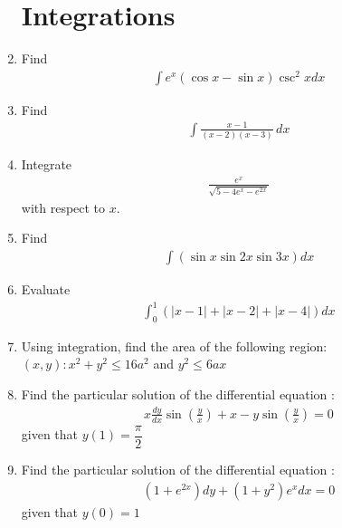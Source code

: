 \documentclass[12pt,-letter paper]{article}
\providecommand{\brak}[1]{\ensuremath{\left(#1\right)}}
\begin{document}
\begin{enumerate}

\section*{Integrations}

\item Find \begin{align*}\int e^x\brak{\cos x-\sin x}\csc^2 x dx\end{align*}

\item Find \begin{align*}\int \frac{x-1}{(x-2)(x-3)}\,dx\end{align*}

\item Integrate \begin{align*}\frac{e^x}{\sqrt{5-4e^x-e^{2x}}}\end{align*} with respect to $x$.

\item Find \begin{align*}\int \brak{\sin x \sin 2x \sin 3x} dx\end{align*}

\item Evaluate \begin{align*}\int_{0}^{1}\brak{|x-1|+|x-2|+|x-4|} dx\end{align*}

\item Using integration, find the area of the following region:
       ${(x,y): x^2+y^2\leq 16a^2}$ and ${y^2 \leq 6ax}$	


\item Find the particular solution of the differential equation :
	\begin{align*}
             x\frac{dy}{dx}\sin\brak{\frac{y}{x}}+x-y\sin\brak{\frac{y}{x}}=0
        \end{align*} given that $y(1)=\dfrac{\pi}{2}$
        
\item Find the particular solution of the differential equation :
	\begin{align*}
	      \brak{1+e^{2x}}dy+\brak{1+y^2}e^x dx=0
	\end{align*} given that $y(0)=1$
\end{enumerate}
\end{document}
